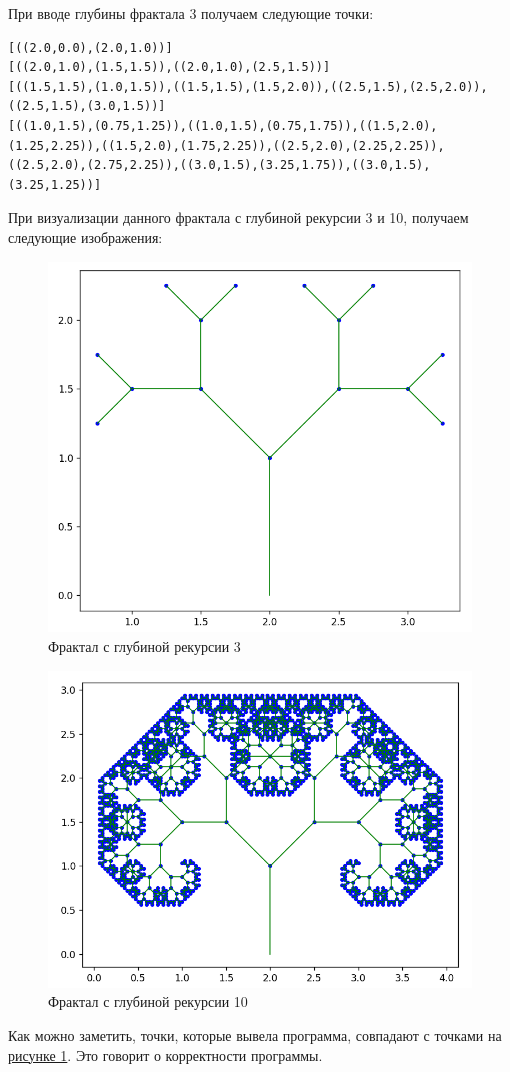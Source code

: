 \documentclass[10pt,a4paper,final]{article} %
\begin{document}
При вводе глубины фрактала 3 получаем следующие точки:

\begin{lstlisting}
[((2.0,0.0),(2.0,1.0))]
[((2.0,1.0),(1.5,1.5)),((2.0,1.0),(2.5,1.5))]
[((1.5,1.5),(1.0,1.5)),((1.5,1.5),(1.5,2.0)),((2.5,1.5),(2.5,2.0)),((2.5,1.5),(3.0,1.5))]
[((1.0,1.5),(0.75,1.25)),((1.0,1.5),(0.75,1.75)),((1.5,2.0),(1.25,2.25)),((1.5,2.0),(1.75,2.25)),((2.5,2.0),(2.25,2.25)),((2.5,2.0),(2.75,2.25)),((3.0,1.5),(3.25,1.75)),((3.0,1.5),(3.25,1.25))]
\end{lstlisting}


При визуализации данного фрактала с глубиной рекурсии 3 и 10, получаем следующие изображения:

\begin{figure}[htpb]
	\centering
	\includegraphics[width=0.6\linewidth]{img/3}
	\caption{Фрактал с глубиной рекурсии 3}
	\label{1}
\end{figure}

\newpage
\begin{figure}[htbp]
	\centering
	\includegraphics[width=0.6\linewidth]{img/4}
	\caption{Фрактал с глубиной рекурсии 10}
	\label{2}
\end{figure}


Как можно заметить, точки, которые вывела программа, совпадают с точками на \hyperref[1]{рисунке 1}. Это говорит о корректности программы.
\end{document}
